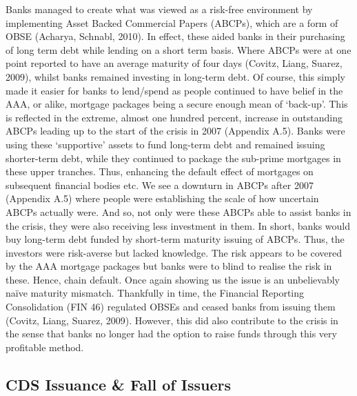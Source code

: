 \documentclass[11pt, english]{article}
\begin{document}
	Banks managed to create what was viewed as a risk-free environment by implementing Asset Backed Commercial Papers (ABCPs), which are a form of OBSE (Acharya, Schnabl, 2010). In effect, these aided banks in their purchasing of long term debt while lending on a short term basis. Where ABCPs were at one point reported to have an average maturity of four days (Covitz, Liang, Suarez, 2009), whilst banks remained investing in long-term debt. Of course, this simply made it easier for banks to lend/spend as people continued to have belief in the AAA, or alike, mortgage packages being a secure enough mean of `back-up'. This is reflected in the extreme, almost one hundred percent, increase in outstanding ABCPs leading up to the start of the crisis in 2007 (Appendix A.5). Banks were using these `supportive' assets to fund long-term debt and remained issuing shorter-term debt, while they continued to package the sub-prime mortgages in these upper tranches. Thus, enhancing the default effect of mortgages on subsequent financial bodies etc. We see a downturn in ABCPs after 2007 (Appendix A.5) where people were establishing the scale of how uncertain ABCPs actually were. And so, not only were these ABCPs able to assist banks in the crisis, they were also receiving less investment in them. In short, banks would buy long-term debt funded by short-term maturity issuing of ABCPs. Thus, the investors were risk-averse but lacked knowledge. The risk appears to be covered by the AAA mortgage packages but banks were to blind to realise the risk in these. Hence, chain default. Once again showing us the issue is an unbelievably naïve maturity mismatch. Thankfully in time, the Financial Reporting Consolidation (FIN 46) regulated OBSEs and ceased banks from issuing them (Covitz, Liang, Suarez, 2009). However, this did also contribute to the crisis in the sense that banks no longer had the option to raise funds through this very profitable method.

	\subsection{CDS Issuance \& Fall of Issuers}
\end{document}
